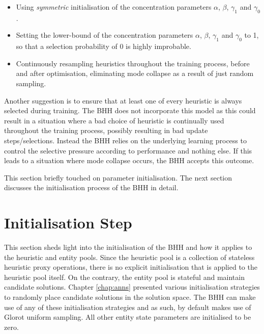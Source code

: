 \begin{itemize}
    \item Using \textit{symmetric} initialisation of the concentration parameters $\alpha$, $\beta$, $\gamma_{1}$ and $\gamma_{0}$.
    
    \item Setting the lower-bound of the concentration parameters $\alpha$, $\beta$, $\gamma_{1}$ and $\gamma_{0}$ to 1, so that a selection probability of 0 is highly improbable.
    
    \item Continuously resampling heuristics throughout the training process, before and after optimisation, eliminating mode collapse as a result of just random sampling.
\end{itemize}

Another suggestion is to ensure that at least one of every heuristic is always selected during training. The \ac{BHH} does not incorporate this model as this could result in a situation where a bad choice of heuristic is continually used throughout the training process, possibly resulting in bad update steps/selections. Instead the \ac{BHH} relies on the underlying learning process to control the selective pressure according to performance and nothing else. If this leads to a situation where mode collapse occurs, the \ac{BHH} accepts this outcome.

This section briefly touched on parameter initialisation. The next section discusses the initialisation process of the \ac{BHH} in detail.

\section{Initialisation Step}
\label{sec:bhh:initialisation_step}

This section sheds light into the initialisation of the \ac{BHH} and how it applies to the heuristic and entity pools. Since the heuristic pool is a collection of stateless heuristic proxy operations, there is no explicit initialisation that is applied to the heuristic pool itself. On the contrary, the entity pool is stateful and maintain candidate solutions. Chapter \ref{chap:anns} presented various initialisation strategies to randomly place candidate solutions in the solution space. The \ac{BHH} can make use of any of these initialisation strategies and as such, by default makes use of Glorot uniform sampling. All other entity state parameters are initialised to be zero.


